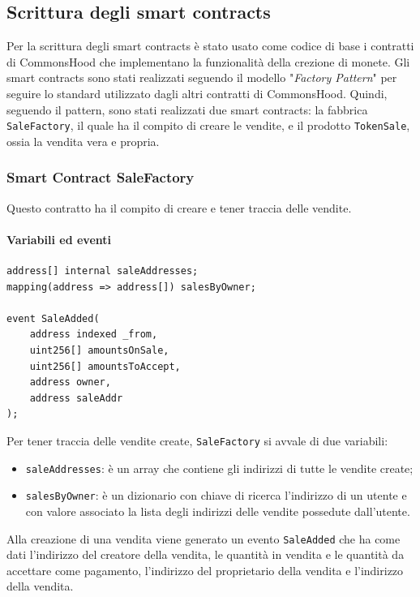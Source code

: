 \documentclass[a4paper]{article}
\begin{document}
        \subsection{Scrittura degli smart contracts}
        \label{writeContracts}
        Per la scrittura degli smart contracts è stato usato come codice di base i contratti di CommonsHood che implementano la funzionalità della crezione di monete.
        Gli smart contracts sono stati realizzati seguendo il modello "\emph{Factory Pattern}" per seguire lo standard utilizzato dagli altri contratti di CommonsHood. Quindi, seguendo il pattern, sono stati realizzati
        due smart contracts: la fabbrica \verb|SaleFactory|, il quale ha il compito di creare le vendite, e il prodotto \verb|TokenSale|, ossia la vendita vera e propria.
        \subsubsection{Smart Contract SaleFactory}
        Questo contratto ha il compito di creare e tener traccia delle vendite.
        \paragraph{Variabili ed eventi}
\begin{lstlisting}[style=ES6, title={Variabili ed eventi di SaleFactory}]
address[] internal saleAddresses;
mapping(address => address[]) salesByOwner;

event SaleAdded(
    address indexed _from,
    uint256[] amountsOnSale,
    uint256[] amountsToAccept,
    address owner,
    address saleAddr
);
\end{lstlisting}
        Per tener traccia delle vendite create, \verb|SaleFactory| si avvale di due variabili:
        \begin{itemize}
          \item \verb|saleAddresses|: è un array che contiene gli indirizzi di tutte le vendite create;
          \item \verb|salesByOwner|: è un dizionario con chiave di ricerca l'indirizzo di un utente e con valore associato la lista degli indirizzi delle vendite possedute dall'utente.
        \end{itemize}
        Alla creazione di una vendita viene generato un evento \verb|SaleAdded| che ha come dati l'indirizzo del creatore della vendita, le quantità in vendita e le quantità da accettare come pagamento, l'indirizzo del proprietario della vendita e l'indirizzo della vendita.
\end{document}
